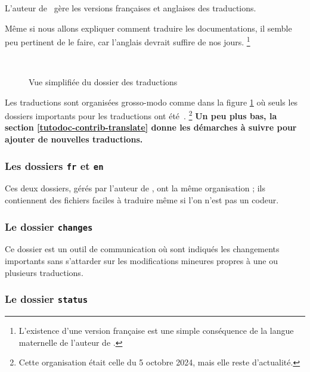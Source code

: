 \begin{tdocnote}
    L'auteur de \thisproj\ gère les versions françaises et anglaises des traductions.
\end{tdocnote}


\begin{tdoccaut}
    Même si nous allons expliquer comment traduire les documentations, il semble peu pertinent de le faire, car l'anglais devrait suffire de nos jours.%
    \footnote{
        L'existence d'une version française est une simple conséquence de la langue maternelle de l'auteur de \thisproj.
    }
\end{tdoccaut}

\begin{figure}[ht]
    \centering
    \contribtranslatedirtree\
    \caption{Vue simplifiée du dossier des traductions}
    \label{tutodoc-contrib-translate-dir}
\end{figure}


Les traductions sont organisées grosso-modo comme dans la figure \ref{tutodoc-contrib-translate-dir} où seuls les dossiers importants pour les traductions ont été \,.%
\footnote{
    Cette organisation était celle du 5 octobre 2024, mais elle reste d'actualité.
}
\textbf{Un peu plus bas, la section \ref{tutodoc-contrib-translate} donne les démarches à suivre pour ajouter de nouvelles traductions.}


\subsubsection{Les dossiers \texttt{fr} et \texttt{en}}

Ces deux dossiers, gérés par l'auteur de \thisproj, ont la même organisation ; ils contiennent des fichiers faciles à traduire même si l'on n'est pas un codeur.


\subsubsection{Le dossier \texttt{changes}}

Ce dossier est un outil de communication où sont indiqués les changements importants sans s'attarder sur les modifications mineures propres à une ou plusieurs traductions.



\subsubsection{Le dossier \texttt{status}}

